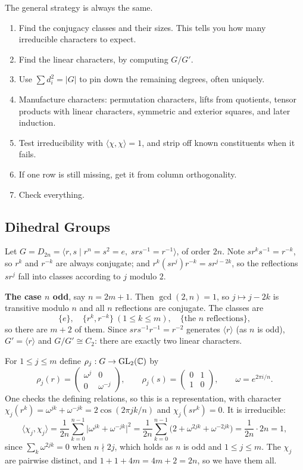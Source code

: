 \documentclass[a4paper]{scrartcl}
\newcommand{\ip}[2]{\langle #1, #2 \rangle}
\newcommand{\gen}[1]{\langle #1 \rangle}
\begin{document}
The general strategy is always the same.
\begin{enumerate}[label=(\arabic*)]
	\item Find the conjugacy classes and their sizes. This tells you how many irreducible characters to expect.
	\item Find the linear characters, by computing $G/G'$.
	\item Use $\sum d_i^2 = |G|$ to pin down the remaining degrees, often uniquely.
	\item Manufacture characters: permutation characters, lifts from quotients, tensor products with linear characters, symmetric and exterior squares, and later induction.
	\item Test irreducibility with $\ip\chi\chi = 1$, and strip off known constituents when it fails.
	\item If one row is still missing, get it from column orthogonality.
	\item Check everything.
\end{enumerate}

\subsection{Dihedral Groups}

Let $G = D_{2n} = \gen{r,s \mid r^n = s^2 = e,\; srs^{-1} = r^{-1}}$, of order $2n$. Note $sr^ks^{-1} = r^{-k}$, so $r^k$ and $r^{-k}$ are always conjugate; and $r^k(sr^j)r^{-k} = sr^{j-2k}$, so the reflections $sr^j$ fall into classes according to $j$ modulo $2$.

\textbf{The case $n$ odd}, say $n = 2m+1$. Then $\gcd(2,n) = 1$, so $j \mapsto j - 2k$ is transitive modulo $n$ and all $n$ reflections are conjugate. The classes are
$$\{e\}, \quad \{r^k, r^{-k}\}\ (1\leq k\leq m), \quad \{\text{the } n \text{ reflections}\},$$
so there are $m + 2$ of them. Since $srs^{-1}r^{-1} = r^{-2}$ generates $\gen r$ (as $n$ is odd), $G' = \gen r$ and $G/G' \cong C_2$: there are exactly two linear characters.

For $1 \leq j\leq m$ define $\rho_j : G \to \operatorname{GL}_2(\mathbb{C})$ by
$$\rho_j(r) = \begin{pmatrix}\omega^j & 0\\ 0 & \omega^{-j}\end{pmatrix}, \qquad \rho_j(s) = \begin{pmatrix}0&1\\1&0\end{pmatrix}, \qquad \omega = e^{2\pi i/n}.$$
One checks the defining relations, so this is a representation, with character $\chi_j(r^k) = \omega^{jk}+\omega^{-jk} = 2\cos(2\pi jk/n)$ and $\chi_j(sr^k) = 0$. It is irreducible:
$$\ip{\chi_j}{\chi_j} = \frac1{2n}\sum_{k=0}^{n-1}\big|\omega^{jk}+\omega^{-jk}\big|^2 = \frac1{2n}\sum_{k=0}^{n-1}\big(2 + \omega^{2jk}+\omega^{-2jk}\big) = \frac{1}{2n}\cdot 2n = 1,$$
since $\sum_k \omega^{2jk} = 0$ when $n \nmid 2j$, which holds as $n$ is odd and $1\leq j\leq m$. The $\chi_j$ are pairwise distinct, and $1 + 1 + 4m = 4m+2 = 2n$, so we have them all.
\end{document}
